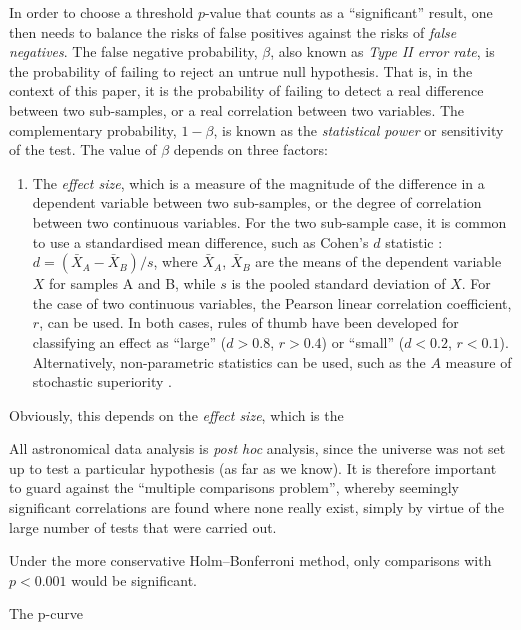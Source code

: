 In order to choose a threshold \(p\)-value that counts as a
``significant'' result, one then needs to balance the risks of false
positives against the risks of \textit{false negatives}.  The false
negative probability, \(\beta\), also known as \textit{Type II error
  rate}, is the probability of failing to reject an untrue null
hypothesis.  That is, in the context of this paper, it is the
probability of failing to detect a real difference between two
sub-samples, or a real correlation between two variables.  The
complementary probability, \(1 - \beta\), is known as the
\textit{statistical power} or sensitivity of the test.  The value of
\(\beta\) depends on three factors:
\begin{enumerate}[1.]
\item The \textit{effect size}, which is a measure of the magnitude of
  the difference in a dependent variable between two sub-samples, or
  the degree of correlation between two continuous variables.  For the
  two sub-sample case, it is common to use a standardised mean
  difference, such as Cohen's \(d\) statistic \citep{Cohen:1988a}:
  \(d = (\bar{X}_A - \bar{X}_B) / s\), where \(\bar{X}_A\),
  \(\bar{X}_B\) are the means of the dependent variable \(X\) for
  samples A and B, while \(s\) is the pooled standard deviation of
  \(X\).  For the case of two continuous variables, the Pearson linear
  correlation coefficient, \(r\), can be used.  In both cases, rules
  of thumb have been developed \citep{Ruscio:2008a} for classifying an
  effect as ``large'' (\(d > 0.8\), \(r > 0.4\)) or ``small''
  (\(d < 0.2\), \(r < 0.1\)).  Alternatively, non-parametric
  statistics can be used, such as the \(A\) measure of stochastic
  superiority \citep{Delaney:2002a}.
\end{enumerate}

Obviously, this depends on the \textit{effect size}, which is the 


All astronomical data analysis is \emph{post hoc} analysis, since the universe was not set up to test a particular hypothesis (as far as we know).  It is therefore important to guard against the ``multiple comparisons problem'', whereby seemingly significant correlations are found where none really exist, simply by virtue of the large number of tests that were carried out.

Under the more conservative Holm--Bonferroni method, only comparisons with \(p < 0.001\) would be significant. 

The p-curve \citep{Head:2015a}

